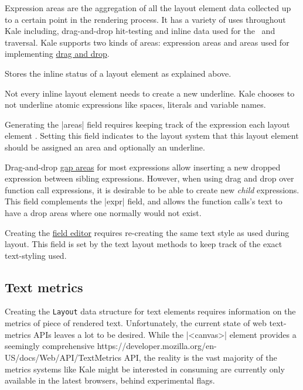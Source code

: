  Expression areas are the aggregation of all the layout element
data collected up to a certain point in the rendering process. It has a
variety of uses throughout Kale including, drag-and-drop hit-testing and inline
data used for the~\ak{^} and~ traversal. Kale supports two kinds of
areas: expression areas and  areas used for implementing
\hyperref[impl:dnd]{drag and drop}.

 Stores the inline status of a layout element as explained
above.

 Not every inline layout element needs to create
a new underline. Kale
chooses to not underline atomic expressions like spaces, literals and variable
names.

 Generating the |areas| field requires keeping track of the
expression each layout element . Setting this field indicates
to the layout system that this layout element should be assigned an area and
optionally an underline.

 Drag-and-drop \hyperref[layout:areas]{gap areas} for most
expressions allow inserting a new dropped expression between sibling
expressions. However, when using drag and drop over function call expressions,
it is desirable to be able to create new \emph{child} expressions. This field
complements the |expr| field, and allows the function calls's text to have a
drop areas where one normally would not exist.

 Creating the \hyperref[soln:field_editing]{field editor} requires
re-creating the same text style as used during layout. This field is set by the
text layout methods to keep track of the exact text-styling used.

\subsection{Text metrics}

Creating the \texttt{Layout} data structure for text elements requires
information on the metrics of piece of rendered text. Unfortunately, the current
state of web text-metrics APIs leaves a lot to be desired. While
the |<canvas>| element provides a seemingly comprehensive
{https://developer.mozilla.org/en-US/docs/Web/API/TextMetrics} API,
the reality is the vast majority of the metrics systems like Kale might
be interested in consuming are currently only available in the latest
browsers, behind experimental flags.


